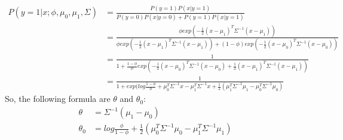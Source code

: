\begin{answer}
\begin{align*}
    P(y=1|x;\phi, \mu_0, \mu_1, \Sigma) &= \frac{P(y=1)P(x|y=1)}{P(y=0)P(x|y=0)+P(y=1)P(x|y=1)}\\
    &= \frac{\phi exp(-\frac{1}{2}(x-\mu_1)^T\Sigma^{-1}(x-\mu_1))}{\phi exp(-\frac{1}{2}(x-\mu_1)^T\Sigma^{-1}(x-\mu_1)) + (1 - \phi) exp(-\frac{1}{2}(x-\mu_0)^T\Sigma^{-1}(x-\mu_0))}\\
    &= \frac{1}{1 + \frac{1-\phi}{\phi}exp(-\frac{1}{2}(x-\mu_0)^T\Sigma^{-1}(x-\mu_0)+\frac{1}{2}(x-\mu_1)^T\Sigma^{-1}(x-\mu_1))}\\
    &=\frac{1}{1+exp(log\frac{1-\phi}{\phi} + \mu_0^T\Sigma^{-1}x - \mu_1^T\Sigma^{-1}x + \frac{1}{2}(\mu_1^T\Sigma^{-1}\mu_1 - \mu_0^T\Sigma^{-1}\mu_0)}
\end{align*}
So, the following formula are $\theta$ and $\theta_0$:
\begin{align*}
    \theta &= \Sigma^{-1}(\mu_1-\mu_0)\\
    \theta_0 &= log\frac{\phi}{1 - \phi} + \frac{1}{2}(\mu_0^T\Sigma^{-1}\mu_0 - \mu_1^T\Sigma^{-1}\mu_1)
\end{align*}
\end{answer}
